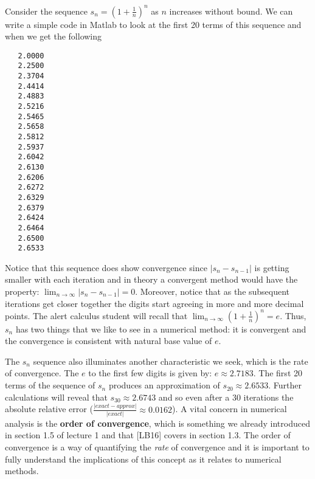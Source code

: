 \documentclass[twoside]{article}
\renewcommand{\cite}[1]{[#1]}
\def\ds{\displaystyle}
\begin{document}
Consider the sequence $\ds s_n = (1+\frac 1n)^n$ as $n$ increases without bound. We can write a simple code in Matlab to look at the first 20 terms of this sequence and when we get the following
\begin{verbatim}
   2.0000
   2.2500
   2.3704
   2.4414
   2.4883
   2.5216
   2.5465
   2.5658
   2.5812
   2.5937
   2.6042
   2.6130
   2.6206
   2.6272
   2.6329
   2.6379
   2.6424
   2.6464
   2.6500
   2.6533
    \end{verbatim}
Notice that this sequence does show convergence since $\ds \vert s_n-s_{n-1}\vert$ is getting smaller with each iteration and in theory a convergent method would have the property: $\ds \lim_{n \rightarrow \infty}  \vert s_n-s_{n-1}\vert = 0$. Moreover, notice that as the subsequent iterations get closer together the  digits start agreeing in more and more decimal points. The alert calculus student will recall that $\ds \lim_{n \rightarrow \infty} (1+\frac 1n)^n = e$. Thus, $\ds s_n$ has two things that we like to see in a numerical method: it is convergent and the convergence is consistent with natural base value of $e$. 

The $\ds s_n$ sequence also illuminates another characteristic we seek, which is the rate of convergence. The $e$ to the first few digits is given by: $\ds e \approx 2.7183$. The first 20 terms of the sequence of $\ds s_n$ produces an approximation of $\ds s_{20} \approx 2.6533.$ Further calculations will reveal that $\ds s_{30} \approx 2.6743$ and so even after a 30 iterations the absolute relative error ($\ds \frac {\vert exact - approx \vert}{\vert exact \vert} \approx 0.0162$). A vital concern in numerical analysis is the {\bf order of convergence}, which is something we already introduced in section 1.5 of lecture 1 and that \cite{LB16} covers in section 1.3. The order of convergence is a way of quantifying the {\it rate} of convergence and it is important to fully understand the implications of this concept as it relates to numerical methods. 
\end{document}
